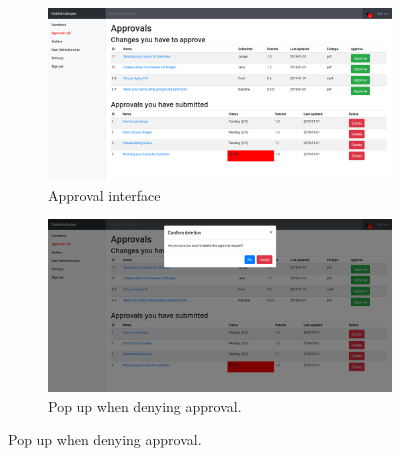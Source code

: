 \begin{figure}[H]
	\centering
	\begin{subfigure}[b]{0.48\textwidth}
		\includegraphics[width=\textwidth]{billeder/iteration1Prototyper/Approval.png}
		\caption{Approval interface}
		\label{fig:3-approve}
	\end{subfigure}
	\quad
	\begin{subfigure}[b]{0.48\textwidth}
		\includegraphics[width=\textwidth]{billeder/iteration1Prototyper/ApprovalDenial.png}
		\caption{Pop up when denying approval.}
		\label{fig:3-ApproveDenial}
	\end{subfigure}
\end{figure}
